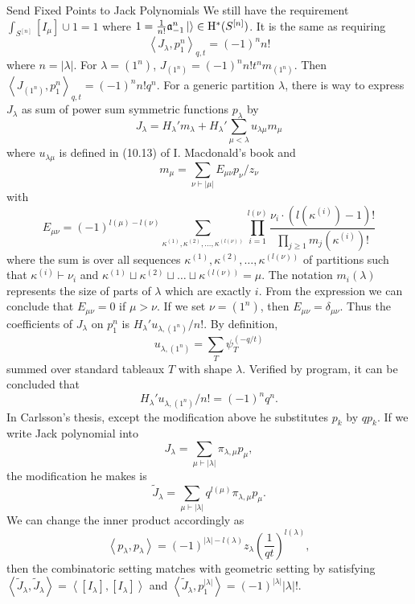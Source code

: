 \documentclass{article}
\renewcommand{\frak}[1]{\mathfrak{#1}}
\newcommand{\lr}[1]{\left({#1}\right)}
\newcommand{\inprod}[1]{\left<{#1}\right>}
\DeclareMathOperator{\coH}{H^*}
\newcommand{\vacuum}{\ket{}}
\begin{document}
\begin{subsection}{Send Fixed Points to Jack Polynomials}
We still have the requirement $\int_{S^{[n]}}[I_\mu]\cup 1 = 1$ where $1 = \frac{1}{n!}\frak{a}_{-1}^n\vacuum\in\coH(S^{[n]})$. It is the same as requiring
\[
\inprod{J_\lambda,p_1^{n}}_{q,t} = (-1)^{n}n!
\]where $n = |\lambda|$.
For $\lambda = (1^n)$, $J_{(1^n)} = (-1)^nn!t^{n}m_{(1^n)}$. Then $\inprod{J_{(1^n)}, p_1^n}_{q,t} = (-1)^nn!q^{n}$.
For a generic partition $\lambda$, there is way to express $J_\lambda$ as sum of power sum symmetric functions $p_\lambda$ by 
\[J_\lambda = H_\lambda'm_\lambda + H_\lambda'\sum_{\mu<\lambda} u_{\lambda\mu}m_\mu\]
where $u_{\lambda\mu}$ is defined in (10.13) of I. Macdonald's book and 
\[m_\mu = \sum_{\nu\vdash|\mu|} E_{\mu\nu}p_\nu/z_\nu\]with
\[
E_{\mu\nu} = (-1)^{l(\mu) - l(\nu)}\sum_{\kappa^{(1)},\kappa^{(2)},\ldots,\kappa^{(l(\nu))}}\prod_{i=1}^{l(\nu)}\frac{\nu_i\cdot(l(\kappa^{(i)})-1)!}{\prod_{j\geqslant 1}m_j(\kappa^{(i)})!}
\]
where the sum is over all sequences $\kappa^{(1)},\kappa^{(2)},\ldots,\kappa^{(l(\nu))}$ of partitions such that $\kappa^{(i)}\vdash \nu_i$ and $\kappa^{(1)}\sqcup\kappa^{(2)}\sqcup\ldots\sqcup\kappa^{(l(\nu))} = \mu$.
The notation $m_i(\lambda)$ represents the size of parts of $\lambda$ which are exactly $i$. From the expression we can conclude that $E_{\mu\nu} = 0$ if $\mu>\nu$. If we set $\nu = (1^n)$, then $E_{\mu\nu} = \delta_{\mu\nu}.$ Thus the coefficients of $J_\lambda$ on $p_1^n$ is $H_\lambda'u_{\lambda,(1^n)}/n!$. By definition, 
\[u_{\lambda,(1^n)} = \sum_{T}\psi_T^{(-q/t)}\]summed over standard tableaux $T$ with shape $\lambda$. Verified by program, it can be concluded that
\[H_\lambda'u_{\lambda,(1^n)}/n! = (-1)^nq^n.\]
In Carlsson's thesis, except the modification above he substitutes $p_k$ by $qp_k$. If we write Jack polynomial into \[J_\lambda = \sum_{\mu\vdash|\lambda|}\pi_{\lambda,\mu}p_\mu,\] the modification he makes is
\[\tilde{J}_\lambda = \sum_{\mu\vdash|\lambda|}q^{l(\mu)}\pi_{\lambda,\mu}p_\mu.\]
We can change the inner product accordingly as
\[\inprod{p_\lambda,p_\lambda} = (-1)^{|\lambda|-l(\lambda)}z_\lambda\lr{\frac{1}{qt}}^{l(\lambda)},\]
then the combinatoric setting matches with geometric setting by satisfying $\inprod{\tilde{J}_\lambda,\tilde{J}_\lambda} = \inprod{[I_\lambda],[I_\lambda]}$ and $\inprod{\tilde{J}_\lambda,p_1^{|\lambda|}} = (-1)^{|\lambda|}|\lambda|!$.
\end{subsection}
\end{document}
